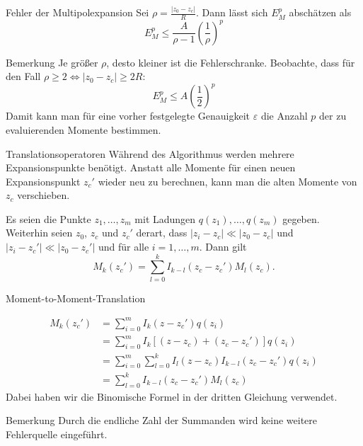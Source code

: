 \documentclass[ngerman]{beamer}
\begin{document}
\begin{frame}{Fehler der Multipolexpansion}
Sei $\rho = \frac{|z_0-z_c|}{R}$. Dann lässt sich $E^p_M$ abschätzen als 
\begin{equation}\label{rhomultipolerror}
E^p_M \leq \frac{A}{\rho-1}\left(\frac{1}{\rho}\right)^p
\end{equation}
\begin{block}{Bemerkung}
Je größer $\rho$, desto kleiner ist die Fehlerschranke. Beobachte, dass für den Fall $\rho \geq 2 \Leftrightarrow |z_0-z_c| \geq 2 R$:
\begin{equation}\label{halfmultipolerror}
E^p_M \leq A\left(\frac{1}{2}\right)^p
\end{equation}
Damit kann man für eine vorher festgelegte Genauigkeit $\varepsilon$ die Anzahl $p$ der zu evaluierenden Momente bestimmen.
\end{block}
\end{frame}

\begin{frame}{Translationsoperatoren}
Während des Algorithmus werden mehrere Expansionspunkte benötigt. Anstatt alle Momente für einen neuen Expansionspunkt $z_c'$ wieder neu zu berechnen, kann man die alten Momente von $z_c$ \glqq verschieben\grqq.
\begin{Satz}
Es seien die Punkte $z_1,\ldots, z_m$ mit Ladungen $q(z_1),\ldots,q(z_m)$ gegeben. Weiterhin seien $z_0$, $z_c$ und $z_c'$ derart, dass $|z_i-z_c| \ll |z_0-z_c|$ und $|z_i-z_c'| \ll |z_0-z_c'|$  und für alle $i=1,\ldots,m$. Dann gilt
\begin{equation}\label{M2Meq}
M_k(z_c') = \sum_{l=0}^k I_{k-l}(z_c-z_c')M_l(z_c).
\end{equation}
\end{Satz}
\end{frame}

\begin{frame}{Moment-to-Moment-Translation}
\footnotesize
\begin{Beweis}
\begin{align*}
M_k(z_c') &= \sum_{i=0}^m I_k(z-z_c')q(z_i) \\
&=  \sum_{i=0}^m I_k\left[(z-z_c) + (z_c-z_c')\right]q(z_i) \\
&= \sum_{i=0}^m \sum_{l=0}^k I_l(z-z_c)I_{k-l}(z_c-z_c') q(z_i)\\
&= \sum_{l=0}^k I_{k-l}(z_c-z_c')M_l(z_c)
\end{align*}
Dabei haben wir die Binomische Formel in der dritten Gleichung verwendet.
\end{Beweis}
\begin{block}{Bemerkung}
Durch die endliche Zahl der Summanden wird keine weitere Fehlerquelle eingeführt.
\end{block}
\end{frame}
\end{document}
